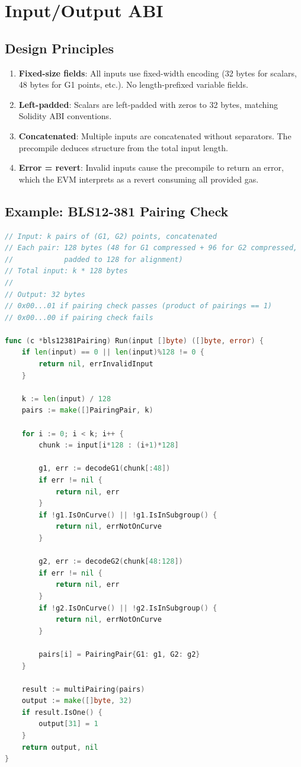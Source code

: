 \section{Input/Output ABI}


\subsection{Design Principles}

\begin{enumerate}[nosep]
  \item \textbf{Fixed-size fields}: All inputs use fixed-width encoding (32 bytes for
    scalars, 48 bytes for G1 points, etc.). No length-prefixed variable fields.
  \item \textbf{Left-padded}: Scalars are left-padded with zeros to 32 bytes, matching
    Solidity ABI conventions.
  \item \textbf{Concatenated}: Multiple inputs are concatenated without separators. The
    precompile deduces structure from the total input length.
  \item \textbf{Error = revert}: Invalid inputs cause the precompile to return an error,
    which the EVM interprets as a revert consuming all provided gas.
\end{enumerate}

\subsection{Example: BLS12-381 Pairing Check}

\begin{lstlisting}[language=Go,caption={BLS12-381 pairing input/output format}]
// Input: k pairs of (G1, G2) points, concatenated
// Each pair: 128 bytes (48 for G1 compressed + 96 for G2 compressed,
//            padded to 128 for alignment)
// Total input: k * 128 bytes
//
// Output: 32 bytes
// 0x00...01 if pairing check passes (product of pairings == 1)
// 0x00...00 if pairing check fails

func (c *bls12381Pairing) Run(input []byte) ([]byte, error) {
    if len(input) == 0 || len(input)%128 != 0 {
        return nil, errInvalidInput
    }

    k := len(input) / 128
    pairs := make([]PairingPair, k)

    for i := 0; i < k; i++ {
        chunk := input[i*128 : (i+1)*128]

        g1, err := decodeG1(chunk[:48])
        if err != nil {
            return nil, err
        }
        if !g1.IsOnCurve() || !g1.IsInSubgroup() {
            return nil, errNotOnCurve
        }

        g2, err := decodeG2(chunk[48:128])
        if err != nil {
            return nil, err
        }
        if !g2.IsOnCurve() || !g2.IsInSubgroup() {
            return nil, errNotOnCurve
        }

        pairs[i] = PairingPair{G1: g1, G2: g2}
    }

    result := multiPairing(pairs)
    output := make([]byte, 32)
    if result.IsOne() {
        output[31] = 1
    }
    return output, nil
}
\end{lstlisting}

